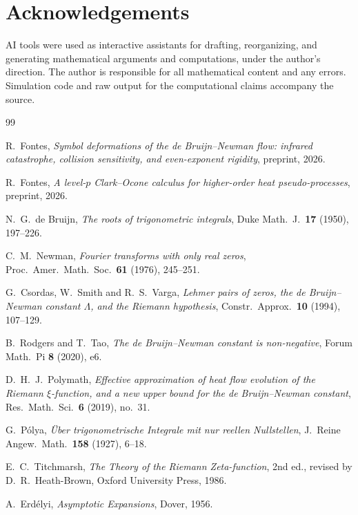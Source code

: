 \documentclass[11pt,reqno]{amsart}
\theoremstyle{plain}
\theoremstyle{definition}
\theoremstyle{remark}
\begin{document}
\section*{Acknowledgements}
AI tools were used as interactive assistants for drafting, reorganizing, and
generating mathematical arguments and computations, under the author's
direction. The author is responsible for all mathematical content and any
errors. Simulation code and raw output for the computational claims
accompany the source.

\begin{thebibliography}{99}

 R.~Fontes, \emph{Symbol deformations of the de
Bruijn--Newman flow: infrared catastrophe, collision sensitivity, and
even-exponent rigidity}, preprint, 2026.

 R.~Fontes, \emph{A level-$p$ Clark--Ocone calculus for
higher-order heat pseudo-processes}, preprint, 2026.

 N.~G.~de Bruijn, \emph{The roots of trigonometric
integrals}, Duke Math.\ J.\ \textbf{17} (1950), 197--226.

 C.~M.~Newman, \emph{Fourier transforms with only real
zeros}, Proc.\ Amer.\ Math.\ Soc.\ \textbf{61} (1976), 245--251.

 G.~Csordas, W.~Smith and R.~S.~Varga, \emph{Lehmer pairs of
zeros, the de Bruijn--Newman constant $\Lambda$, and the Riemann
hypothesis}, Constr.\ Approx.\ \textbf{10} (1994), 107--129.

 B.~Rodgers and T.~Tao, \emph{The de Bruijn--Newman
constant is non-negative}, Forum Math.\ Pi \textbf{8} (2020), e6.

 D.~H.~J.~Polymath, \emph{Effective approximation of
heat flow evolution of the Riemann $\xi$-function, and a new upper bound for
the de Bruijn--Newman constant}, Res.\ Math.\ Sci.\ \textbf{6} (2019),
no.~31.

 G.~P\'olya, \emph{\"Uber trigonometrische Integrale mit
nur reellen Nullstellen}, J.\ Reine Angew.\ Math.\ \textbf{158} (1927),
6--18.

 E.~C.~Titchmarsh, \emph{The Theory of the Riemann
Zeta-function}, 2nd ed., revised by D.~R.~Heath-Brown, Oxford University
Press, 1986.

 A.~Erd\'elyi, \emph{Asymptotic Expansions}, Dover, 1956.


\end{thebibliography}
\end{document}
